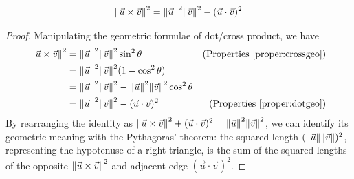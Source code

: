 \begin{proper}
\begin{align}
\norm{\vec{u} \times \vec{v}}^2 = \norm{\vec{u}}^2 \norm{\vec{v}}^2 - (\vec{u} \cdot \vec{v})^2
\end{align}
\end{proper}
\begin{proof}
Manipulating the geometric formulae of dot/cross product, we have
\begin{align*}
\norm{\vec{u} \times \vec{v}}^2 &= \norm{\vec{u}}^2 \norm{\vec{v}}^2 \sin^2 \theta  &\text{(Properties \ref{proper:crossgeo})} \\
&= \norm{\vec{u}}^2 \norm{\vec{v}}^2 (1 - \cos^2 \theta) \\
&= \norm{\vec{u}}^2 \norm{\vec{v}}^2 - \norm{\vec{u}}^2 \norm{\vec{v}}^2 \cos^2 \theta \\
&= \norm{\vec{u}}^2 \norm{\vec{v}}^2 - (\vec{u} \cdot \vec{v})^2 &\text{(Properties \ref{proper:dotgeo})}
\end{align*}
By rearranging the identity as $\norm{\vec{u} \times \vec{v}}^2 + (\vec{u} \cdot \vec{v})^2 = \norm{\vec{u}}^2 \norm{\vec{v}}^2$, we can identify its geometric meaning with the Pythagoras' theorem: the squared length $(\norm{\vec{u}}\norm{\vec{v}})^2$, representing the hypotenuse of a right triangle, is the sum of the squared lengths of the opposite $\norm{\vec{u} \times \vec{v}}^2$ and adjacent edge $(\vec{u} \cdot \vec{v})^2$.
\end{proof}

